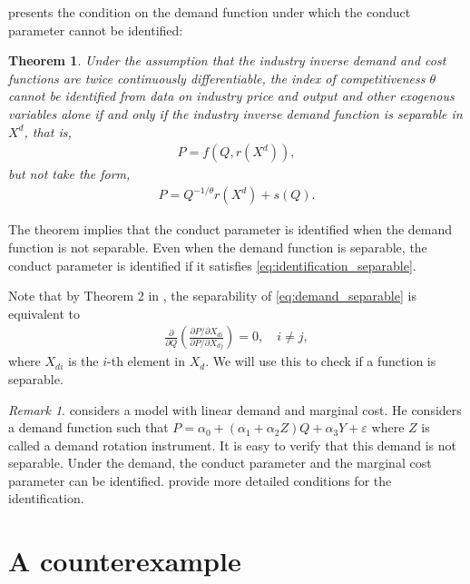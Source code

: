 \documentclass[11pt, a4paper]{article}
\newtheorem{theorem}{Theorem}
\theoremstyle{remark}
\newtheorem{remark}{Remark}
\begin{document}
\citet{lau1982identifying} presents the condition on the demand function under which the conduct parameter cannot be identified:
\begin{theorem}\label{theorem_lau}
    Under the assumption that the industry inverse demand and cost functions are twice continuously differentiable, the index of competitiveness $\theta$ cannot be identified from data on industry price and output and other exogenous variables alone if and only if the industry inverse demand function is separable in $X^{d}$, that is,
    \begin{align}
        P = f(Q, r(X^{d})), \label{eq:demand_separable}
    \end{align}
    but not take the form, 
    \begin{align}
        P = Q^{-1/\theta}r(X^{d}) + s(Q). \label{eq:identification_separable}
    \end{align}
\end{theorem}
The theorem implies that the conduct parameter is identified when the demand function is not separable.
Even when the demand function is separable, the conduct parameter is identified if it satisfies \eqref{eq:identification_separable}.

Note that by Theorem 2 in \citet{goldmanNote1964}, the separability of \eqref{eq:demand_separable} is equivalent to
\begin{align}
    \frac{\partial }{\partial Q} \left(\frac{\partial P/\partial X_{di}}{\partial P/\partial X_{dj}} \right) = 0,\quad i \ne j, 
\end{align}
where $X_{di}$ is the $i$-th element in $X_{d}$.
We will use this to check if a function is separable.

\begin{remark}
    \citet{bresnahan1982oligopoly} considers a model with linear demand and marginal cost.
    He considers a demand function such that $P = \alpha_0 + (\alpha_1 + \alpha_2 Z) Q + \alpha_3 Y + \varepsilon$ where $Z$ is called a demand rotation instrument.
    It is easy to verify that this demand is not separable.
    Under the demand, the conduct parameter and the marginal cost parameter can be identified.
    \citet{matsumura2023resolving} provide more detailed conditions for the identification.
\end{remark}



\section{A counterexample}
\end{document}
